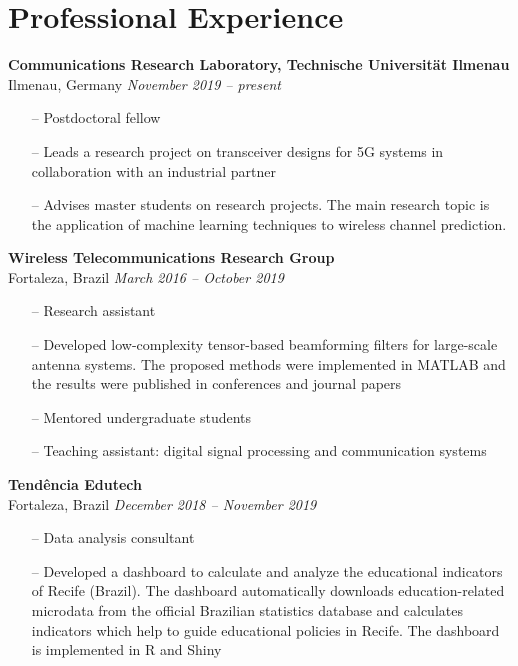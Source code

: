 \section{Professional Experience}

{\bf Communications Research Laboratory, Technische Universit\"at Ilmenau}\\
Ilmenau, Germany  \hfill {\it November 2019 -- present} \\
\begin{itemize}
	\item[--] Postdoctoral fellow
	\item[--] Leads a research project on transceiver designs for 5G systems in collaboration with an industrial partner
	\item[--] Advises master students on research projects. The main research topic is the application of machine learning techniques to wireless channel prediction.
\end{itemize}

{\bf Wireless Telecommunications Research Group}\\
Fortaleza, Brazil \hfill {\it March 2016 -- October 2019}\\
\begin{itemize}
	\item[--] Research assistant
	\item[--] Developed low-complexity tensor-based beamforming filters for large-scale antenna systems. The proposed methods were implemented in MATLAB and the results were published in conferences and journal papers
	\item[--] Mentored undergraduate students
	\item[--] Teaching assistant: digital signal processing and communication systems
\end{itemize}

{\bf Tendência Edutech}\\
Fortaleza, Brazil \hfill {\it December 2018 -- November 2019}\\
\begin{itemize}
	\item[--] Data analysis consultant
	\item[--] Developed a dashboard to calculate and analyze the educational indicators of Recife (Brazil). The dashboard automatically downloads education-related microdata from the official Brazilian statistics database and calculates indicators which help to guide educational policies in Recife. The dashboard is implemented in R and Shiny
\end{itemize}

